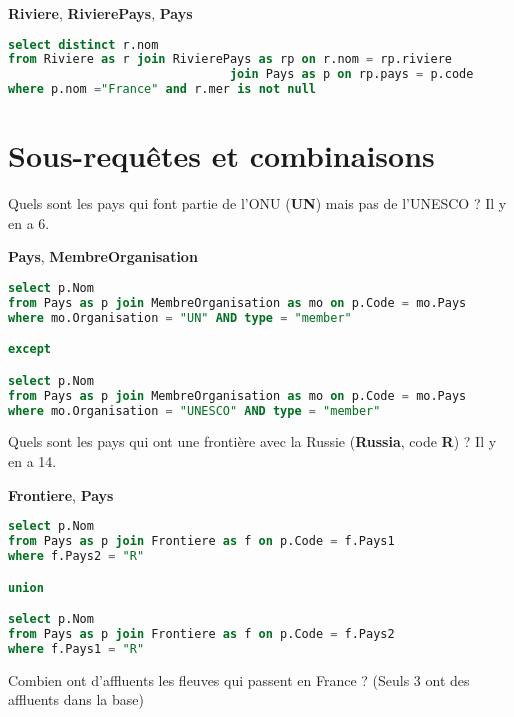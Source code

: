 {\bf Riviere}, {\bf RivierePays}, {\bf Pays}
\begin{Answer}
\begin{lstlisting}[language=SQL]
select distinct r.nom
from Riviere as r join RivierePays as rp on r.nom = rp.riviere
                               join Pays as p on rp.pays = p.code
where p.nom ="France" and r.mer is not null
\end{lstlisting}
\newpage
\end{Answer}
\section{Sous-requêtes et combinaisons}
\begin{Exercise}
Quels sont les pays qui font partie de l'ONU ({\bf UN}) mais pas de l'UNESCO ? Il y en a 6.
\end{Exercise}
{\bf Pays}, {\bf MembreOrganisation}
\begin{Answer}
\begin{lstlisting}[language=SQL]
select p.Nom
from Pays as p join MembreOrganisation as mo on p.Code = mo.Pays
where mo.Organisation = "UN" AND type = "member"

except

select p.Nom
from Pays as p join MembreOrganisation as mo on p.Code = mo.Pays
where mo.Organisation = "UNESCO" AND type = "member"
\end{lstlisting}
\end{Answer}
\begin{Exercise}
Quels sont les pays qui ont une frontière avec la Russie ({\bf Russia}, code {\bf R}) ? Il y en a 14.
\end{Exercise}
{\bf Frontiere}, {\bf Pays}
\begin{Answer}
\begin{lstlisting}[language=SQL]
select p.Nom
from Pays as p join Frontiere as f on p.Code = f.Pays1
where f.Pays2 = "R"

union

select p.Nom
from Pays as p join Frontiere as f on p.Code = f.Pays2
where f.Pays1 = "R"
\end{lstlisting}
\end{Answer}
\begin{Exercise}
Combien ont d'affluents les fleuves qui passent en France ? (Seuls 3 ont des affluents dans la base)
\end{Exercise}

